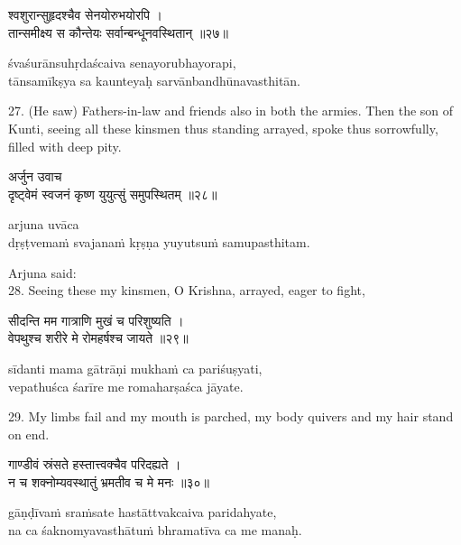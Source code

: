 \begin{gitaverse}
श्वशुरान्सुहृदश्चैव सेनयोरुभयोरपि । \\
तान्समीक्ष्य स कौन्तेयः सर्वान्बन्धूनवस्थितान् ॥२७॥
\end{gitaverse}

\begin{transliteration}
śvaśurānsuhṛdaścaiva senayorubhayorapi, \\
tānsamīkṣya sa kaunteyaḥ sarvānbandhūnavasthitān.
\end{transliteration}

27. (He saw) Fathers-in-law and friends also in both the armies. Then the son
of Kunti, seeing all these kinsmen thus standing arrayed, spoke thus
sorrowfully, filled with deep pity.

\begin{gitaverse}
अर्जुन उवाच \\
दृष्ट्वेमं स्वजनं कृष्ण युयुत्सुं समुपस्थितम् ॥२८॥
\end{gitaverse}

\begin{transliteration}
arjuna uvāca \\
dṛṣṭvemaṁ svajanaṁ kṛṣṇa yuyutsuṁ samupasthitam.
\end{transliteration}

Arjuna said: \\
28. Seeing these my kinsmen, O Krishna, arrayed, eager to fight,

\begin{gitaverse}
सीदन्ति मम गात्राणि मुखं च परिशुष्यति । \\
वेपथुश्च शरीरे मे रोमहर्षश्च जायते ॥२९॥
\end{gitaverse}

\begin{transliteration}
sīdanti mama gātrāṇi mukhaṁ ca pariśuṣyati, \\
vepathuśca śarīre me romaharṣaśca jāyate.
\end{transliteration}

29. My limbs fail and my mouth is parched, my body quivers and my hair stand on
end.

\begin{gitaverse}
गाण्डीवं स्रंसते हस्तात्त्वक्चैव परिदह्यते । \\
न च शक्नोम्यवस्थातुं भ्रमतीव च मे मनः ॥३०॥
\end{gitaverse}

\begin{transliteration}
gāṇḍīvaṁ sraṁsate hastāttvakcaiva paridahyate, \\
na ca śaknomyavasthātuṁ bhramatīva ca me manaḥ.
\end{transliteration}

